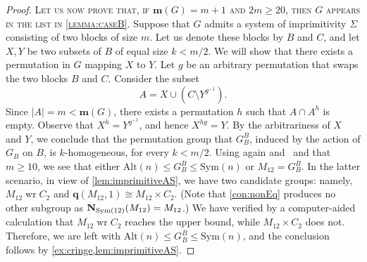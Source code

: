 \documentclass[a4paper]{amsart}
\newcommand{\Sym}{\mathrm{Sym}}
\newcommand{\Alt}{\mathrm{Alt}}
\renewcommand{\wr}{\mathop{\mathrm{wr}}}
\newcommand{\m}{\mathbf{m}}
\newcommand{\qrk}{\mathbf{q}}
\theoremstyle{definition}
\begin{document}
\begin{proof}
    \smallskip
    \noindent \textsc{Let us now prove that, if $\m(G) = m+1$ and $2m\ge 20$, then $G$ appears in the list in \cref{lemma:caseB}.}
    Suppose that $G$ admits a system of imprimitivity $\Sigma$ consisting of two blocks of size $m$. Let us denote these blocks by $B$ and $C$, and let $X, Y$ be two subsets of $B$ of equal size $k< m/2$.  We will show that there exists a permutation in $G$ mapping $X$ to $Y$.
    Let $g$ be an arbitrary permutation that swaps the two blocks $B$ and $C$. Consider the subset
    \[A = X \cup \left( C \setminus Y^{g^{-1}} \right) .\]
    Since $|A| = m < \m(G)$, there exists a permutation $h$ such that $A \cap A^h$ is empty. Observe that $X^h =Y^{g^{-1}}$, and hence $X^{hg} = Y$. By the arbitrariness of $X$ and $Y$, we conclude that the permutation group that $G^B_B$, induced by the action of $G_B$ on $B$, is $k$-homogeneous, for every $k < m/2$. Using again \cite[Section~7]{Cameron1981} and~\cite[Theorem~9.4B]{DixonMortimer} and that $m\ge 10$, we see that either $\Alt(n) \le G_B^B \le \Sym(n)$ or $M_{12} = G_B^B$. In the latter scenario, in view of \cref{lem:imprimitiveAS}, we have two candidate groups: namely, $M_{12} \wr C_2$ and $\qrk(M_{12},1) \cong M_{12} \times C_2$. (Note that \cref{con:nonEq} produces no other subgroup as ${\bf N}_{\Sym(12)}(M_{12}) = M_{12}$.) We have verified by a computer-aided calculation that $M_12 \wr C_2$ reaches the upper bound, while $M_{12} \times C_2$ does not. Therefore, we are left with $\Alt(n) \le G_B^B \le \Sym(n)$, and the conclusion follows by \cref{ex:cringe,lem:imprimitiveAS}. 
\end{proof}
\end{document}
